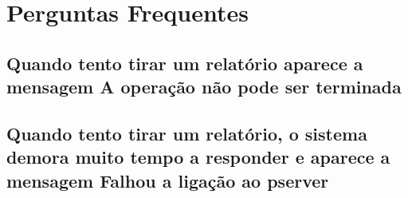 \section{Perguntas Frequentes}


\subsection{Quando tento tirar um relatório aparece a mensagem A operação não pode ser terminada}


\subsection{Quando tento tirar um relatório, o sistema demora muito tempo a responder e aparece a mensagem Falhou a ligação ao pserver}